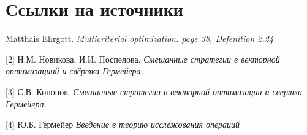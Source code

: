 
\section{Ссылки на источники}
\begin{flushleft}
[1] Matthais Ehrgott. \textit{Multicriterial optimization. page 38, Defenition 2.24}

[2] Н.М. Новикова, И.И. Поспелова. \textit{Смешанные стратегии в векторной оптимизациий и свёртка Гермейера.}

[3] С.В. Кононов. \textit{Смешанные стратегии в векторной оптимизации и свертка Гермейера.}

[4] Ю.Б. Гермейер \textit{Введение в теорию исслежования операций}
\end{flushleft}
